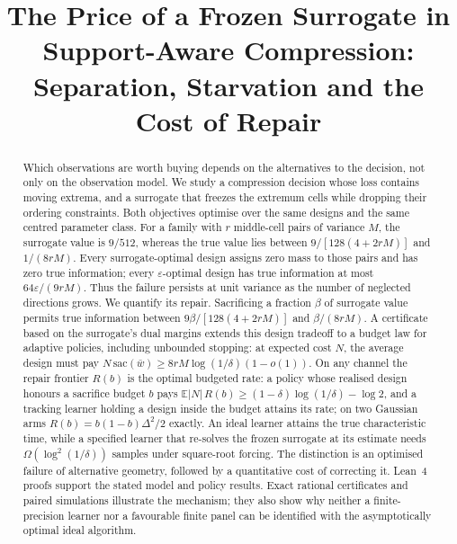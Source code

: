 



\title{The Price of a Frozen Surrogate in Support-Aware Compression:\\
Separation, Starvation and the Cost of Repair}

\author{
}

\maketitle

\begin{abstract}
Which observations are worth buying depends on the alternatives to the decision, not only on
the observation model. We study a compression decision whose loss contains moving extrema,
and a surrogate that freezes the extremum cells while dropping their ordering constraints.
Both objectives optimise over the same designs and the same centred parameter class.
For a family with $r$ middle-cell pairs of variance $M$, the surrogate value is $9/512$,
whereas the true value lies between $9/[128(4+2rM)]$ and $1/(8rM)$.
Every surrogate-optimal design assigns zero mass to those pairs and has zero true information;
every $\varepsilon$-optimal design has true information at most $64\varepsilon/(9rM)$.
Thus the failure persists at unit variance as the number of neglected directions grows.
We quantify its repair. Sacrificing a fraction $\beta$ of surrogate value permits true
information between $9\beta/[128(4+2rM)]$ and $\beta/(8rM)$.
A certificate based on the surrogate's dual margins extends this design tradeoff to a budget
law for adaptive policies, including unbounded stopping: at expected cost $N$, the average
design must pay $N\,\mathrm{sac}(\bar w)\ge8rM\log(1/\delta)(1-o(1))$.
On any channel the repair frontier $R(b)$ is the optimal budgeted rate: a policy whose realised
design honours a sacrifice budget $b$ pays $\mathbb E|N|\,R(b)\ge(1-\delta)\log(1/\delta)-\log2$,
and a tracking
learner holding a design inside the budget attains its rate; on two Gaussian arms
$R(b)=b(1-b)\Delta^2/2$ exactly.
An ideal learner attains the true characteristic time, while a specified learner that
re-solves the frozen surrogate at its estimate needs $\Omega(\log^2(1/\delta))$ samples under
square-root forcing. The distinction is an optimised failure of alternative geometry, followed
by a quantitative cost of correcting it. Lean~4 proofs support the stated model and policy
results. Exact rational certificates and paired simulations illustrate the mechanism;
they also show why neither a finite-precision learner nor a favourable finite panel can be
identified with the asymptotically optimal ideal algorithm.
\end{abstract}

